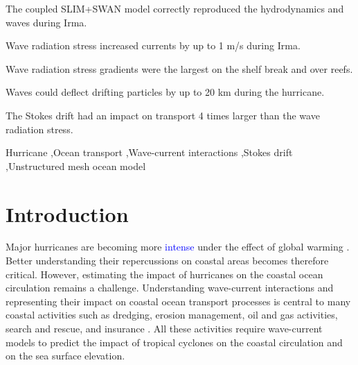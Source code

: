 \documentclass[preprint,12pt,authoryear]{elsarticle}
\newcommand{\modif}[1]{\textcolor{blue}{#1}}
\begin{document}
\begin{frontmatter}

    \begin{highlights}
        \item The coupled SLIM+SWAN model correctly reproduced the hydrodynamics and waves during Irma.
	    \item Wave radiation stress increased currents by up to 1 m/s during Irma.
	    \item Wave radiation stress gradients were the largest on the shelf break and over reefs. 
	    \item Waves could deflect drifting particles by up to 20 km during the hurricane.
	    \item The Stokes drift had an impact on transport 4 times larger than the wave radiation stress.
    \end{highlights}

    \begin{keyword}
        Hurricane \sep Ocean transport \sep Wave-current interactions \sep Stokes drift \sep Unstructured mesh ocean model



    \end{keyword}

\end{frontmatter}

\linenumbers

\section{Introduction}

Major hurricanes are becoming more \modif{intense} under the effect of global warming \citep{bhatia2019recent, knutson2020tropical}. Better understanding their repercussions on coastal areas becomes therefore critical. However, estimating the impact of hurricanes on the coastal ocean circulation remains a challenge. Understanding wave-current interactions and representing their impact on coastal ocean transport processes is central to many coastal activities such as dredging, erosion management, oil and gas activities, search and rescue, and insurance \citep{bever2013simulating,li1998three, breivik2013advances}. All these activities require wave-current models to predict the impact of tropical cyclones on the coastal circulation and on the sea surface elevation.
\end{document}
